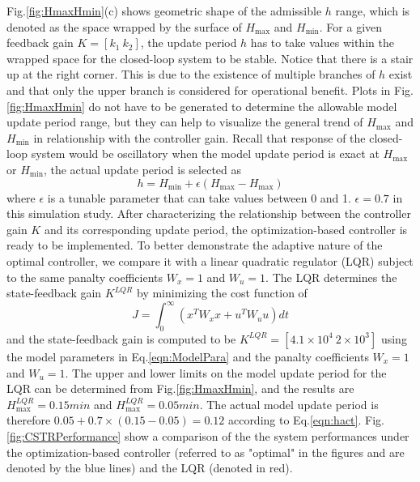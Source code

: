 \documentclass[letterpaper, 10 pt, conference]{ieeeconf}\IEEEoverridecommandlockouts%
\begin{document}
Fig.\ref{fig:HmaxHmin}(c) shows geometric shape of the admissible $h$ range, which is denoted as the space wrapped by the surface of $H_{\max}$ and $H_{\min}$. For a given feedback gain $K = [k_1\ k_2]$, the update period $h$ has to take values within the wrapped space for the closed-loop system to be stable. Notice that there is a stair up at the right corner. This is due to the existence of multiple branches of $h$ exist and that only the upper branch is considered for operational benefit. Plots in Fig.\ref{fig:HmaxHmin} do not have to be generated to determine the allowable model update period range, but they can help to visualize the general trend of $H_{\max}$ and $H_{\min}$ in relationship with the controller gain. Recall that response of the closed-loop system would be oscillatory when the model update period is exact at $H_{\max}$ or $H_{\min}$, the actual update period is selected as
\begin{equation}\label{eqn:hact}
  h = H_{\min} + \epsilon(H_{\max} - H_{\max})
\end{equation}
where $\epsilon$ is a tunable parameter that can take values between 0 and 1. $\epsilon = 0.7$ in this simulation study. After characterizing the relationship between the controller gain $K$ and its corresponding update period, the optimization-based controller is ready to be implemented. To better demonstrate the adaptive nature of the optimal controller, we compare it with a linear quadratic regulator (LQR) subject to the same panalty coefficients $W_x = 1$ and $W_u = 1$. The LQR determines the state-feedback gain $K^{LQR}$ by minimizing the cost function of
\begin{equation}
  J = \int_0^\infty (x^TW_xx + u^TW_uu)dt
\end{equation}
and the state-feedback gain is computed to be $K^{LQR} = [4.1\times 10^4\ 2\times 10^3]$ using the model parameters in Eq.\ref{eqn:ModelPara} and the panalty coefficients $W_x = 1$ and $W_u = 1$. The upper and lower limits on the model update period for the LQR can be determined from Fig.\ref{fig:HmaxHmin}, and the results are $H_{\max}^{LQR} = 0.15min$ and $H_{\max}^{LQR} = 0.05min$. The actual model update period is therefore $0.05 + 0.7\times(0.15 - 0.05) = 0.12$ according to Eq.\ref{eqn:hact}. Fig.\ref{fig:CSTRPerformance} show a comparison of the the system performances under the optimization-based controller (referred to as "optimal" in the figures and are denoted by the blue lines) and the LQR (denoted in red).
\end{document}

